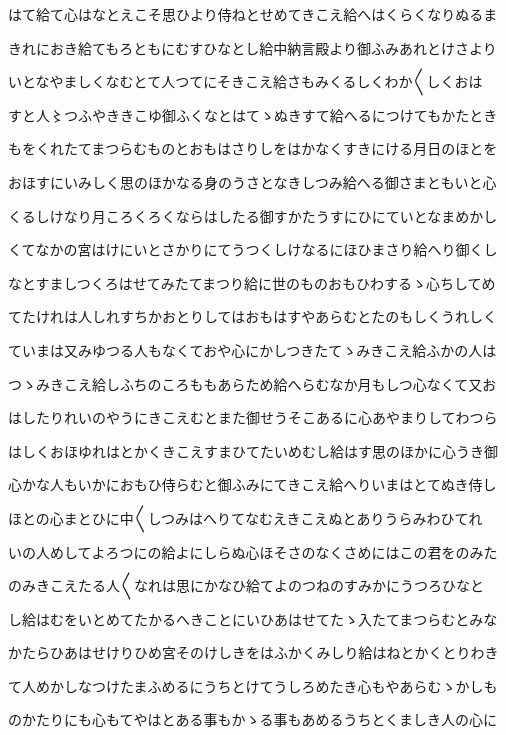 \documentclass[a4paper,11pt,landscape]{ltjtarticle}
\begin{document}
はて給て心はなとえこそ思ひより侍ねとせめてきこえ給へはくらくなりぬるま
\par\medskip
きれにおき給てもろともにむすひなとし給中納言殿より御ふみあれとけさより
\par\medskip
いとなやましくなむとて人つてにそきこえ給さもみくるしくわか〱しくおは
\par\medskip
すと人〻つふやききこゆ御ふくなとはてゝぬきすて給へるにつけてもかたとき
\par\medskip
もをくれたてまつらむものとおもはさりしをはかなくすきにける月日のほとを
\par\medskip
おほすにいみしく思のほかなる身のうさとなきしつみ給へる御さまともいと心
\par\medskip
くるしけなり月ころくろくならはしたる御すかたうすにひにていとなまめかし
\par\medskip
くてなかの宮はけにいとさかりにてうつくしけなるにほひまさり給へり御くし
\par\medskip
なとすましつくろはせてみたてまつり給に世のものおもひわするゝ心ちしてめ
\par\medskip
てたけれは人しれすちかおとりしてはおもはすやあらむとたのもしくうれしく
\par\medskip
ていまは又みゆつる人もなくておや心にかしつきたてゝみきこえ給ふかの人は
\par\medskip
つゝみきこえ給しふちのころももあらため給へらむなか月もしつ心なくて又お
\par\medskip
はしたりれいのやうにきこえむとまた御せうそこあるに心あやまりしてわつら
\par\medskip
はしくおほゆれはとかくきこえすまひてたいめむし給はす思のほかに心うき御
\par\medskip
心かな人もいかにおもひ侍らむと御ふみにてきこえ給へりいまはとてぬき侍し
\par\medskip
ほとの心まとひに中〱しつみはへりてなむえきこえぬとありうらみわひてれ
\par\medskip
いの人めしてよろつにの給よにしらぬ心ほそさのなくさめにはこの君をのみた
\par\medskip
のみきこえたる人〱なれは思にかなひ給てよのつねのすみかにうつろひなと
\par\medskip
し給はむをいとめてたかるへきことにいひあはせてたゝ入たてまつらむとみな
\par\medskip
かたらひあはせけりひめ宮そのけしきをはふかくみしり給はねとかくとりわき
\par\medskip
て人めかしなつけたまふめるにうちとけてうしろめたき心もやあらむゝかしも
\par\medskip
のかたりにも心もてやはとある事もかゝる事もあめるうちとくましき人の心に
\end{document}
